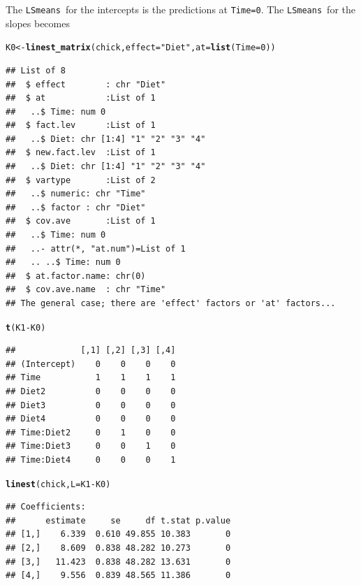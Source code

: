 \documentclass[10pt]{article}\usepackage[]{graphicx}\usepackage[]{color}
\makeatletter
\newcommand{\hlnum}[1]{\textcolor[rgb]{0.686,0.059,0.569}{#1}}%
\newcommand{\hlstr}[1]{\textcolor[rgb]{0.192,0.494,0.8}{#1}}%
\newcommand{\hlopt}[1]{\textcolor[rgb]{0,0,0}{#1}}%
\newcommand{\hlstd}[1]{\textcolor[rgb]{0.345,0.345,0.345}{#1}}%
\newcommand{\hlkwb}[1]{\textcolor[rgb]{0.69,0.353,0.396}{#1}}%
\newcommand{\hlkwc}[1]{\textcolor[rgb]{0.333,0.667,0.333}{#1}}%
\newcommand{\hlkwd}[1]{\textcolor[rgb]{0.737,0.353,0.396}{\textbf{#1}}}%
\newenvironment{kframe}{%
 \def\at@end@of@kframe{}%
 \ifinner\ifhmode%
  \def\at@end@of@kframe{\end{minipage}}%
  \begin{minipage}{\columnwidth}%
 \fi\fi%
 \def\FrameCommand##1{\hskip\@totalleftmargin \hskip-\fboxsep
 \colorbox{shadecolor}{##1}\hskip-\fboxsep
     \hskip-\linewidth \hskip-\@totalleftmargin \hskip\columnwidth}%
 \MakeFramed {\advance\hsize-\width
   \@totalleftmargin\z@ \linewidth\hsize
   \@setminipage}}%
 {\par\unskip\endMakeFramed%
 \at@end@of@kframe}
\newenvironment{knitrout}{}{} %
\def\code#1{\texttt{#1}}
\def\cc#1{\texttt{#1}}
\def\lsmeans{\code{LSmeans}}
\makeatother
\begin{document}
The \lsmeans\ for the intercepts is the predictions at
\cc{Time=0}. The \lsmeans\ for the slopes becomes
\begin{knitrout}
\color{fgcolor}\begin{kframe}
\begin{alltt}
\hlstd{K0} \hlkwb{<-} \hlkwd{linest_matrix}\hlstd{(chick,} \hlkwc{effect}\hlstd{=}\hlstr{"Diet"}\hlstd{,} \hlkwc{at}\hlstd{=}\hlkwd{list}\hlstd{(}\hlkwc{Time}\hlstd{=}\hlnum{0}\hlstd{))}
\end{alltt}
\begin{verbatim}
## List of 8
##  $ effect        : chr "Diet"
##  $ at            :List of 1
##   ..$ Time: num 0
##  $ fact.lev      :List of 1
##   ..$ Diet: chr [1:4] "1" "2" "3" "4"
##  $ new.fact.lev  :List of 1
##   ..$ Diet: chr [1:4] "1" "2" "3" "4"
##  $ vartype       :List of 2
##   ..$ numeric: chr "Time"
##   ..$ factor : chr "Diet"
##  $ cov.ave       :List of 1
##   ..$ Time: num 0
##   ..- attr(*, "at.num")=List of 1
##   .. ..$ Time: num 0
##  $ at.factor.name: chr(0) 
##  $ cov.ave.name  : chr "Time"
## The general case; there are 'effect' factors or 'at' factors...
\end{verbatim}
\begin{alltt}
\hlkwd{t}\hlstd{(K1} \hlopt{-} \hlstd{K0)}
\end{alltt}
\begin{verbatim}
##             [,1] [,2] [,3] [,4]
## (Intercept)    0    0    0    0
## Time           1    1    1    1
## Diet2          0    0    0    0
## Diet3          0    0    0    0
## Diet4          0    0    0    0
## Time:Diet2     0    1    0    0
## Time:Diet3     0    0    1    0
## Time:Diet4     0    0    0    1
\end{verbatim}
\begin{alltt}
\hlkwd{linest}\hlstd{(chick,} \hlkwc{L}\hlstd{=K1}\hlopt{-}\hlstd{K0)}
\end{alltt}
\begin{verbatim}
## Coefficients:
##      estimate     se     df t.stat p.value
## [1,]    6.339  0.610 49.855 10.383       0
## [2,]    8.609  0.838 48.282 10.273       0
## [3,]   11.423  0.838 48.282 13.631       0
## [4,]    9.556  0.839 48.565 11.386       0
\end{verbatim}
\end{kframe}
\end{knitrout}
\end{document}
